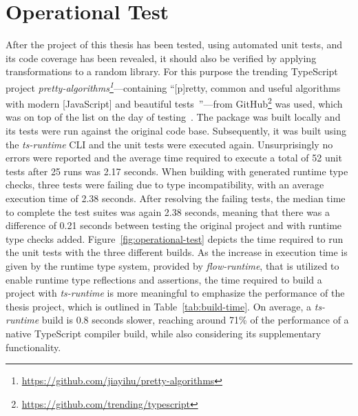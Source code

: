 
\section{Operational Test}
\label{sec:operational-test}

After the project of this thesis has been tested, using automated unit tests, and its code coverage has been revealed, it should also be verified by applying transformations to a random library. For this purpose the trending TypeScript project \emph{pretty-algorithms\footnote{\url{https://github.com/jiayihu/pretty-algorithms}}}---containing ``[p]retty, common and useful algorithms with modern [JavaScript] and beautiful tests~\cite{Evaluation:pretty-algorithms}''---from GitHub\footnote{\url{https://github.com/trending/typescript}} was used, which was on top of the list on the day of testing~\cite{GitHub:Trending:Archive}. The package was built locally and its tests were run against the original code base. Subsequently, it was built using the \emph{ts-runtime} CLI and the unit tests were executed again. Unsurprisingly no errors were reported and the average time required to execute a total of 52 unit tests after 25 runs was 2.17 seconds. When building with generated runtime type checks, three tests were failing due to type incompatibility, with an average execution time of 2.38 seconds. After resolving the failing tests, the median time to complete the test suites was again 2.38 seconds, meaning that there was a difference of 0.21 seconds between testing the original project and with runtime type checks added. Figure~\ref{fig:operational-test} depicts the time required to run the unit tests with the three different builds. As the increase in execution time is given by the runtime type system, provided by \emph{flow-runtime}, that is utilized to enable runtime type reflections and assertions, the time required to build a project with \emph{ts-runtime} is more meaningful to emphasize the performance of the thesis project, which is outlined in Table~\ref{tab:build-time}. On average, a \emph{ts-runtime} build is 0.8 seconds slower, reaching around 71\% of the performance of a native TypeScript compiler build, while also considering its supplementary functionality. 

